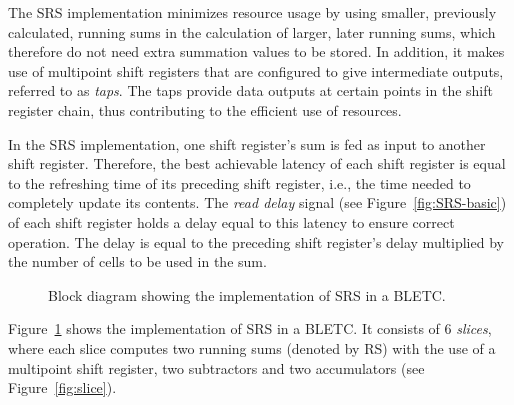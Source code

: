 \documentclass{llncs}
\begin{document}
The SRS implementation minimizes resource usage by using smaller, previously calculated, running sums in the calculation of larger, later running sums, which therefore do not need extra summation values to be stored.
In addition, it makes use of multipoint shift registers that are configured to give intermediate outputs, referred to as \emph{taps}.
The taps provide data outputs at certain points in the shift register chain, thus contributing to the efficient use of resources.

In the SRS implementation, one shift register's sum is fed as input to another shift register.
Therefore, the best achievable latency of each shift register is equal to the refreshing time of its preceding shift register, i.e., the time needed to completely update its contents.
The \emph{read delay} signal (see Figure~\ref{fig:SRS-basic}) of each shift register holds a delay equal to this latency to ensure correct operation.
The delay is equal to the preceding shift register's delay multiplied by the number of cells to be used in the sum.

\begin{figure}[t]
  \centering {}
   \caption{Block diagram showing the implementation of SRS in a BLETC.}
  \label{fig:srs}
\end{figure}

Figure~\ref{fig:srs} shows the implementation of SRS in a BLETC.
It consists of 6 \emph{slices}, where each slice computes two running sums (denoted by RS) with the use of a multipoint shift register, two subtractors and two accumulators (see Figure~\ref{fig:slice}).
\end{document}
